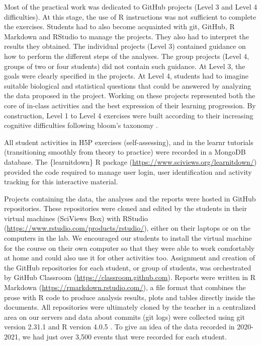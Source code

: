 \documentclass{aims} %
\theoremstyle{definition}
\begin{document}
Most of the practical work was dedicated to GitHub projects (Level 3 and
Level 4 difficulties). At this stage, the use of R instructions was not
sufficient to complete the exercises. Students had to also become
acquainted with git, GitHub, R Markdown and RStudio to manage the
projects. They also had to interpret the results they obtained. The
individual projects (Level 3) contained guidance on how to perform the
different steps of the analyses. The group projects (Level 4, groups of
two or four students) did not contain such guidance. At Level 3, the
goals were clearly specified in the projects. At Level 4, students had
to imagine suitable biological and statistical questions that could be
answered by analyzing the data proposed in the project. Working on these
projects represented both the core of in-class activities and the best
expression of their learning progression. By construction, Level 1 to
Level 4 exercises were built according to their increasing cognitive
difficulties following bloom's taxonomy \cite{Krathwohl2002}.

All student activities in H5P exercises (self-assessing), and in the
learnr tutorials (transitioning smoothly from theory to practice) were
recorded in a MongoDB database. The \{learnitdown\} R package
(\url{https://www.sciviews.org/learnitdown/}) provided the code required
to manage user login, user identification and activity tracking for this
interactive material.

Projects containing the data, the analyses and the reports were hosted
in GitHub repositories. These repositories were cloned and edited by the
students in their virtual machines (SciViews Box) with RStudio
(\url{https://www.rstudio.com/products/rstudio/}), either on their
laptops or on the computers in the lab. We encouraged our students to
install the virtual machine for the course on their own computer so that
they were able to work comfortably at home and could also use it for
other activities too. Assignment and creation of the GitHub repositories
for each student, or group of students, was orchestrated by GitHub
Classroom (\url{https://classroom.github.com}). Reports were written in
R Markdown (\url{https://rmarkdown.rstudio.com/}), a file format that
combines the prose with R code to produce analysis results, plots and
tables directly inside the documents. All repositories were ultimately
cloned by the teacher in a centralized area on our servers and data
about commits (git logs) were collected using git version 2.31.1 and R
version 4.0.5 \cite{Rcoreteam2021}. To give an idea of the data recorded
in 2020-2021, we had just over 3,500 events that were recorded for each
student.
\end{document}
